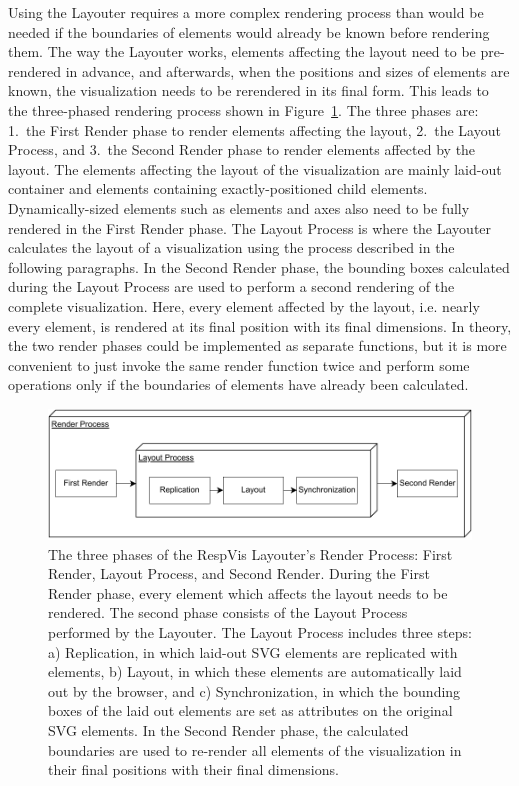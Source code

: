 Using the Layouter requires a more complex rendering process than
would be needed if the boundaries of elements would already be known
before rendering them. The way the Layouter works, elements affecting
the layout need to be pre-rendered in advance, and afterwards, when
the positions and sizes of elements are known, the visualization needs
to be rerendered in its final form. This leads to the three-phased
rendering process shown in Figure~\ref{fig:RenderProcess}. The three
phases are: 1.\ the First Render phase to render elements affecting
the layout, 2.\ the Layout Process, and 3.\ the Second Render phase to
render elements affected by the layout. The elements affecting the
layout of the visualization are mainly laid-out container
 and  elements containing exactly-positioned
child elements. Dynamically-sized elements such as 
elements and axes also need to be fully rendered in the First Render
phase. The Layout Process is where the Layouter calculates the layout
of a visualization using the process described in the following
paragraphs. In the Second Render phase, the bounding boxes calculated
during the Layout Process are used to perform a second rendering of
the complete visualization. Here, every element affected by the
layout, i.e. nearly every element, is rendered at its final position
with its final dimensions. In theory, the two render phases could be
implemented as separate functions, but it is more convenient to just
invoke the same render function twice and perform some operations only
if the boundaries of elements have already been calculated.


\begin{figure}[tp]
\centering
\includegraphics[keepaspectratio,width=\linewidth,height=\thirdh]
{diagrams/respvis-render-process.pdf}
\caption[Render Process When Using the Layouter]{%
The three phases of the RespVis Layouter's Render Process:
First Render, Layout Process, and Second Render.
During the First Render phase, every element which affects
the layout needs to be rendered. The second phase consists of the
Layout Process performed by the Layouter. The Layout Process includes
three steps: a) Replication, in which laid-out SVG elements are replicated with
 elements, b) Layout, in which these 
elements are automatically laid out by the browser, and
c) Synchronization, in which the bounding boxes of the laid out
 elements are set as  attributes on the
original SVG elements. In the Second Render phase, the calculated
boundaries are used to re-render all elements of the visualization in
their final positions with their final dimensions.
}
\label{fig:RenderProcess}
\end{figure}


